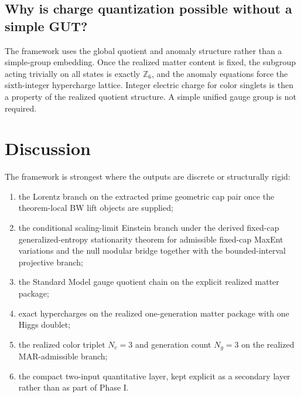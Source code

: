 \documentclass[11pt]{article}
\begin{document}
\subsection{Why is charge quantization possible without a simple GUT?}

The framework uses the global quotient and anomaly structure rather than a simple-group embedding. Once the realized matter content is fixed, the subgroup acting trivially on all states is exactly $\mathbb Z_6$, and the anomaly equations force the sixth-integer hypercharge lattice. Integer electric charge for color singlets is then a property of the realized quotient structure. A simple unified gauge group is not required.

\section{Discussion}

The framework is strongest where the outputs are discrete or structurally rigid:
\begin{enumerate}[leftmargin=2em]
\item the Lorentz branch on the extracted prime geometric cap pair once the theorem-local BW lift objects are supplied;
\item the conditional scaling-limit Einstein branch under the derived fixed-cap generalized-entropy stationarity theorem for admissible fixed-cap MaxEnt variations and the null modular bridge together with the bounded-interval projective branch;
\item the Standard Model gauge quotient chain on the explicit realized matter package;
\item exact hypercharges on the realized one-generation matter package with one Higgs doublet;
\item the realized color triplet \(N_c=3\) and generation count \(N_g=3\) on the realized MAR-admissible branch;
\item the compact two-input quantitative layer, kept explicit as a secondary layer rather than as part of Phase I.
\end{enumerate}
\end{document}
